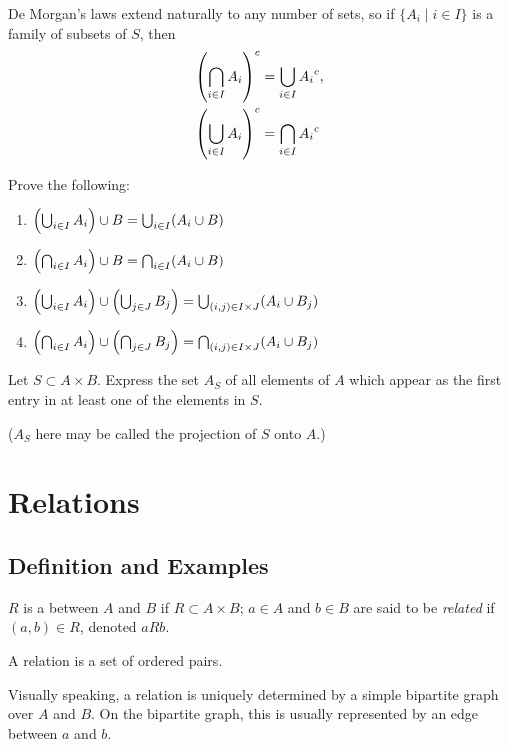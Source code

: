 De Morgan's laws extend naturally to any number of sets, so if $\{A_i \mid i \in I\}$ is a family of subsets of $S$, then
\begin{align*}
\left(\bigcap_{i\in I}A_i\right)^c&=\bigcup_{i\in I}{A_i}^c,\\
\left(\bigcup_{i\in I}A_i\right)^c&=\bigcap_{i\in I}{A_i}^c
\end{align*}

\begin{exercise}
Prove the following:
\begin{enumerate}[label=(\roman*)]
\item $\left(\bigcup_{i\in I}A_i\right)\cup B=\bigcup_{i\in I}(A_i\cup B)$
\item $\left(\bigcap_{i\in I}A_i\right)\cup B=\bigcap_{i\in I}(A_i\cup B)$
\item $\left(\bigcup_{i\in I}A_i\right)\cup\left(\bigcup_{j\in J}B_j\right)=\bigcup_{(i,j)\in I\times J}(A_i\cup B_j)$
\item $\left(\bigcap_{i\in I}A_i\right)\cup\left(\bigcap_{j\in J}B_j\right)=\bigcap_{(i,j)\in I\times J}(A_i\cup B_j)$
\end{enumerate}
\end{exercise}

\begin{exercise}
Let $S\subset A\times B$. Express the set $A_S$ of all elements of $A$ which appear as the first entry in at least one of the elements in $S$.

($A_S$ here may be called the projection of $S$ onto $A$.)
\end{exercise}
\pagebreak

\section{Relations}
\subsection{Definition and Examples}
\begin{definition}[Relation]
$R$ is a  between $A$ and $B$ if $R\subset A\times B$; $a\in A$ and $b\in B$ are said to be \emph{related} if $(a,b)\in R$, denoted $a R b$.
\end{definition}

\begin{remark}
A relation is a set of ordered pairs.
\end{remark}

Visually speaking, a relation is uniquely determined by a simple bipartite graph over $A$ and $B$. On the bipartite graph, this is usually represented by an edge between $a$ and $b$.

